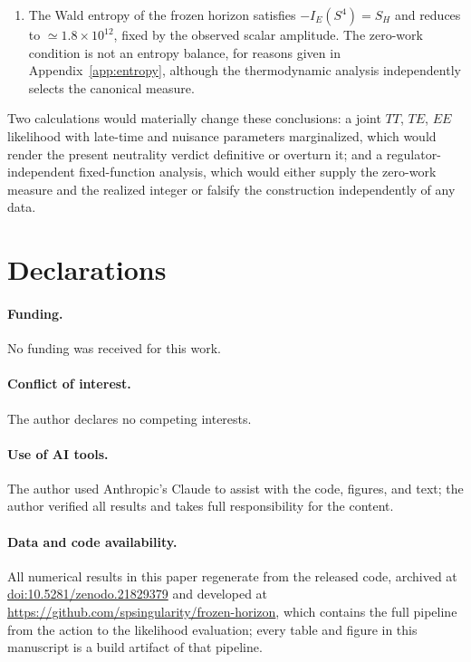 \documentclass[aps,prd,twocolumn,superscriptaddress,nofootinbib,longbibliography]{revtex4-2}
\begin{document}
\begin{enumerate}
\item The Wald entropy of the frozen horizon satisfies $-I_E(S^4)=S_H$ and
reduces to $\simeq1.8\times10^{12}$, fixed by the observed scalar amplitude.
The zero-work condition is not an entropy balance, for reasons given in
Appendix~\ref{app:entropy}, although the thermodynamic analysis
independently selects the canonical measure.
\end{enumerate}

Two calculations would materially change these conclusions: a joint
$TT$, $TE$, $EE$ likelihood with late-time and nuisance parameters
marginalized, which would render the present neutrality verdict definitive
or overturn it; and a regulator-independent fixed-function analysis, which
would either supply the zero-work measure and the realized integer or
falsify the construction independently of any data.

\section*{Declarations}
\paragraph{Funding.} No funding was received for this work.
\paragraph{Conflict of interest.} The author declares no competing
interests.
\paragraph{Use of AI tools.} The author used Anthropic's Claude to assist
with the code, figures, and text; the author verified all results and takes
full responsibility for the content.
\paragraph{Data and code availability.} All numerical results in this paper
regenerate from the released code, archived at
\href{https://doi.org/10.5281/zenodo.21829379}{doi:10.5281/zenodo.21829379}
and developed at \url{https://github.com/spsingularity/frozen-horizon},
which contains the full pipeline from the action to the
likelihood evaluation; every table and figure in this manuscript is a build
artifact of that pipeline.

\appendix
\end{document}
